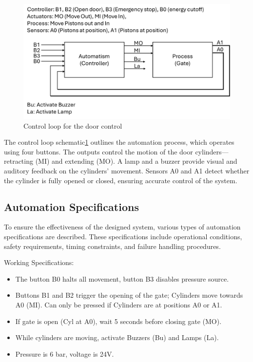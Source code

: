 \begin{figure}[H]
    \includegraphics[width=16cm]{Images/Q1/control_loop.png}
    \centering
    \caption{Control loop for the door control}
    \label{fig:control_loop}
\end{figure}

The control loop schematic\ref{fig:control_loop} outlines the automation process, which operates using four buttons. 
The outputs control the motion of the door cylinders—retracting (MI) and extending (MO). 
A lamp and a buzzer provide visual and auditory feedback on the cylinders' movement. Sensors 
A0 and A1 detect whether the cylinder is fully opened or closed, ensuring accurate control of the system.

\subsection{Automation Specifications} \label{sec:Automation_Specifications}

To ensure the effectiveness of the designed system, various types of automation 
specifications are described. These specifications include operational conditions, 
safety requirements, timing constraints, and failure handling procedures.

Working Specifications:
\begin{itemize}
    \item The button B0 halts all movement, button B3 disables pressure source.
    \item Buttons B1 and B2 trigger the opening of the gate; Cylinders move towards A0 (MI). 
    Can only be pressed if Cylinders are at positions A0 or A1.
    \item If gate is open (Cyl at A0),  wait 5 seconds before closing gate (MO).
    \item While cylinders are moving, activate Buzzers (Bu) and Lamps (La).
    \item Pressure is 6 bar, voltage is 24V.
\end{itemize}

